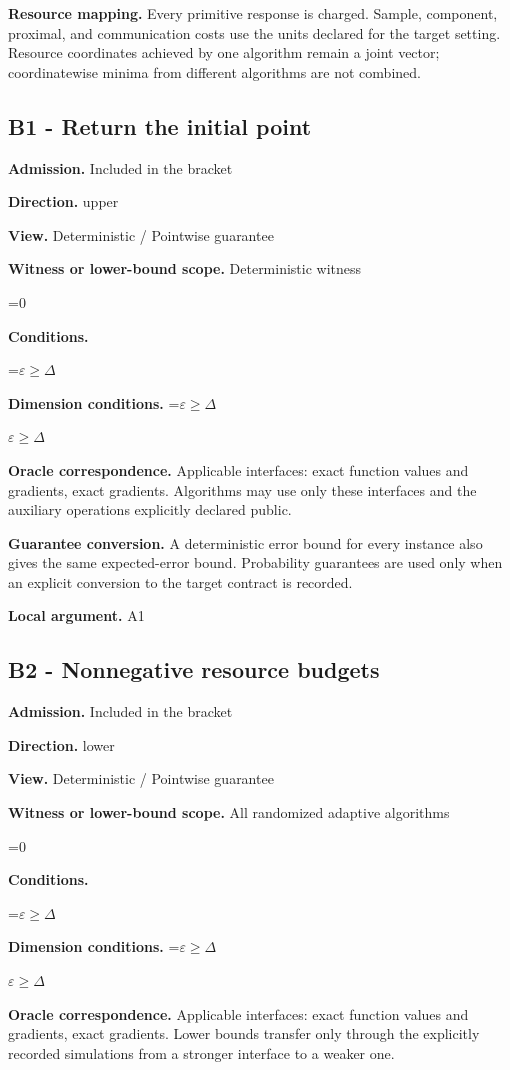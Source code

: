 \documentclass[10pt,a4paper]{article}
\newcommand{\AtlasMath}[1]{\par\begingroup\centering\setbox0=\hbox{$\displaystyle #1$}\ifdim\wd0>1.4\linewidth\typeout{ATLAS WIDE FORMULA: \the\wd0}\fi\ifdim\wd0>\linewidth\resizebox{\linewidth}{!}{\box0}\else\box0\fi\par\endgroup}
\newcommand{\AtlasInlineMath}[1]{\begingroup\setbox0=\hbox{$#1$}\ifdim\wd0>.4\linewidth\endgroup\AtlasMath{#1}\else\endgroup$#1$\fi}
\begin{document}
\textbf{Resource mapping.} Every primitive response is charged. Sample, component, proximal, and communication costs use the units declared for the target setting. Resource coordinates achieved by one algorithm remain a joint vector; coordinatewise minima from different algorithms are not combined.

\subsection{B1 - Return the initial point}
\textbf{Admission.} Included in the bracket

\textbf{Direction.} upper

\textbf{View.} Deterministic / Pointwise guarantee

\textbf{Witness or lower-bound scope.} Deterministic witness

\AtlasMath{0}
\textbf{Conditions.} 
\AtlasMath{\varepsilon\ge\Delta}


\textbf{Dimension conditions.} \AtlasInlineMath{\varepsilon\ge\Delta}

\textbf{Oracle correspondence.} Applicable interfaces: exact function values and gradients, exact gradients. Algorithms may use only these interfaces and the auxiliary operations explicitly declared public.

\textbf{Guarantee conversion.} A deterministic error bound for every instance also gives the same expected-error bound. Probability guarantees are used only when an explicit conversion to the target contract is recorded.

\textbf{Local argument.} A1

\subsection{B2 - Nonnegative resource budgets}
\textbf{Admission.} Included in the bracket

\textbf{Direction.} lower

\textbf{View.} Deterministic / Pointwise guarantee

\textbf{Witness or lower-bound scope.} All randomized adaptive algorithms

\AtlasMath{0}
\textbf{Conditions.} 
\AtlasMath{\varepsilon\ge\Delta}


\textbf{Dimension conditions.} \AtlasInlineMath{\varepsilon\ge\Delta}

\textbf{Oracle correspondence.} Applicable interfaces: exact function values and gradients, exact gradients. Lower bounds transfer only through the explicitly recorded simulations from a stronger interface to a weaker one.
\end{document}
